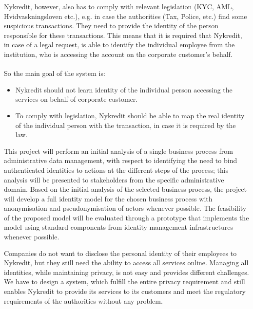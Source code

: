 Nykredit, however, also has to comply with relevant legislation (KYC, AML, Hvidvaskningsloven etc.),  e.g. in case the authorities (Tax, Police, etc.) find some suspicious transactions. They need to provide the identity of the person responsible for these transactions.
This means that it is required that Nykredit, in case of a legal request, is able to identify the individual employee from the institution, who is accessing the account on the corporate customer’s behalf.
\\
\\So the main goal of the system is:
\begin{itemize}
	\item Nykredit should not learn identity of the individual person accessing the services on behalf of corporate customer.
	\item To comply with legislation, Nykredit should be able to map the real identity of the individual person with the transaction, in case it is required by the law.
\end{itemize}
This project will perform an initial analysis of a single business process from administrative data management, with respect to identifying the need to bind authenticated identities to actions at the different steps of the process; this analysis will be presented to stakeholders from the specific administrative domain. Based on the initial analysis of the selected business process, the project will develop a full identity model for the chosen business process with anonymisation and pseudonymisation of actors whenever possible. The feasibility of the proposed model will be evaluated through a prototype that implements the model using standard components from identity management infrastructures whenever possible.

Companies do not want to disclose the personal identity of their employees to Nykredit, but they still need the ability to access all services online. Managing all identities, while maintaining privacy, is not easy and provides different challenges. We have to design a system, which fulfill the entire privacy requirement and still enables Nykredit to provide its services to its customers and meet the regulatory requirements of the authorities without any problem.
 